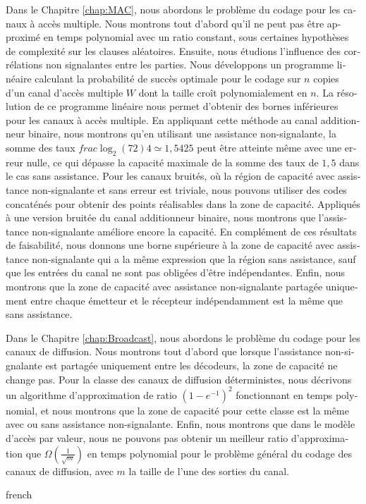\begin{otherlanguage}{french}
Dans le Chapitre \ref{chap:MAC}, nous abordons le problème du codage pour les canaux à accès multiple. Nous montrons tout d'abord qu'il ne peut pas être approximé en temps polynomial  avec un ratio constant, sous certaines hypothèses de complexité sur les clauses aléatoires. Ensuite, nous étudions l'influence des corrélations non signalantes entre les parties. Nous développons un programme linéaire calculant la probabilité de succès optimale pour le codage sur $n$ copies d'un canal d'accès multiple $W$ dont la taille croît polynomialement en $n$. La résolution de ce programme linéaire nous permet d'obtenir des bornes inférieures pour les canaux à accès multiple. En appliquant cette méthode au canal additionneur binaire, nous montrons qu'en utilisant une assistance non-signalante, la somme des taux $frac{\log_2(72)}{4} \simeq 1,5425$ peut être atteinte même avec une erreur nulle, ce qui dépasse la capacité maximale de la somme des taux de $1,5$ dans le cas sans assistance. Pour les canaux bruités, où la région de capacité avec assistance non-signalante et sans erreur est triviale, nous pouvons utiliser des codes concaténés pour obtenir des points réalisables dans la zone de capacité. Appliqués à une version bruitée du canal additionneur binaire, nous montrons que l'assistance non-signalante améliore encore la capacité. En complément de ces résultats de faisabilité, nous donnons une borne supérieure à la zone de capacité avec assistance non-signalante qui a la même expression que la région sans assistance, sauf que les entrées du canal ne sont pas obligées d'être indépendantes. Enfin, nous montrons que la zone de capacité avec assistance non-signalante partagée uniquement entre chaque émetteur et le récepteur indépendamment est la même que sans assistance.

Dans le Chapitre \ref{chap:Broadcast}, nous abordons le problème du codage pour les canaux de diffusion. Nous montrons tout d'abord que lorsque l'assistance non-signalante est partagée uniquement entre les décodeurs, la zone de capacité ne change pas. Pour la classe des canaux de diffusion déterministes, nous décrivons un algorithme d'approximation de ratio $(1-e^{-1})^2$ fonctionnant en temps polynomial, et nous montrons que la zone de capacité pour cette classe est la même avec ou sans assistance non-signalante. Enfin, nous montrons que dans le modèle d'accès par valeur, nous ne pouvons pas obtenir un meilleur ratio d'approximation que $\Omega\left(\frac{1}{\sqrt{m}}\right)$ en temps polynomial pour le problème général du codage des canaux de diffusion, avec $m$ la taille de l'une des sorties du canal.
\end{otherlanguage}{french}

